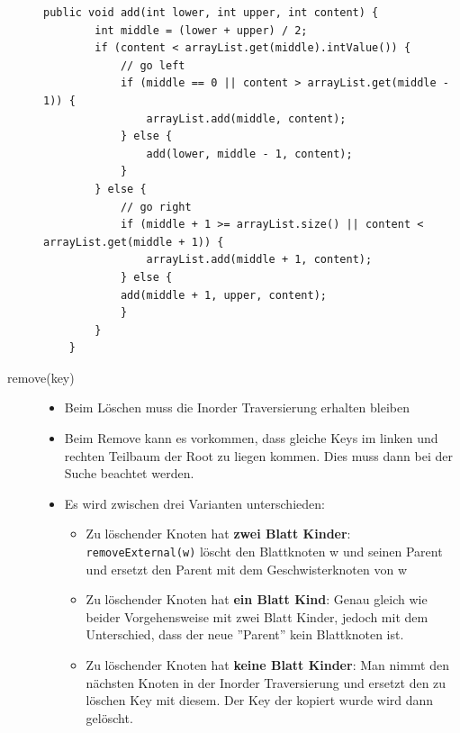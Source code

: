 \begin{description}
	\begin{lstlisting}[caption=Arraylist basierter Einsatz]
	public void add(int lower, int upper, int content) {
		int middle = (lower + upper) / 2;
		if (content < arrayList.get(middle).intValue()) {
			// go left
			if (middle == 0 || content > arrayList.get(middle - 1)) {
				arrayList.add(middle, content);
			} else {
				add(lower, middle - 1, content);
			}
		} else {
			// go right
			if (middle + 1 >= arrayList.size() || content < arrayList.get(middle + 1)) {
				arrayList.add(middle + 1, content);
			} else {
			add(middle + 1, upper, content);
			}
		}
	}
	\end{lstlisting}

\clearpage

	\item[remove(key)] \hfill
	\label{sec:bstremove}
	\begin{itemize}
		\item Beim Löschen muss die Inorder Traversierung erhalten bleiben
		\item Beim Remove kann es vorkommen, dass gleiche Keys im linken und rechten Teilbaum der Root zu liegen kommen. Dies muss dann bei der Suche beachtet werden.
		\item Es wird zwischen drei Varianten unterschieden:
		\begin{itemize}
			\item Zu löschender Knoten hat \textbf{zwei Blatt Kinder}: \lstinline|removeExternal(w)| löscht den Blattknoten w und seinen Parent und ersetzt den Parent mit dem Geschwisterknoten von w
			\item Zu löschender Knoten hat \textbf{ein Blatt Kind}: Genau gleich wie beider Vorgehensweise mit zwei Blatt Kinder, jedoch mit dem Unterschied, dass der neue ''Parent'' kein Blattknoten ist.
			\item Zu löschender Knoten hat \textbf{keine Blatt Kinder}:  Man nimmt den nächsten Knoten in der Inorder Traversierung und ersetzt den zu löschen Key mit diesem. Der Key der kopiert wurde wird dann gelöscht.
		\end{itemize}
		\begin{figure}[ht!]
			\centering
			\begin{minipage}[t]{0.4\textwidth}
				\centering

\end{minipage}
\end{figure}
\end{itemize}
\end{description}
